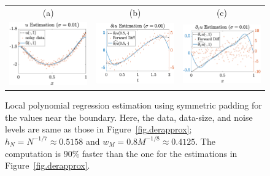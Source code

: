 \documentclass[a4paper,11pt]{article}
\begin{document}
\begin{figure}
\centering
\begin{tabular}{ccc}
(a)&(b)&(c)\\
\includegraphics[width=2in]{Figures/localpolyExp1.eps}&
\includegraphics[width=2in]{Figures/localpolyExp3.eps}&
\includegraphics[width=2in]{Figures/localpolyExp2.eps}
\end{tabular}
\caption{Local polynomial regression estimation using symmetric padding for the values near the boundary. Here, the data, data-size, and noise levels are same as those in Figure~\ref{fig.derapprox}; $h_N=N^{-1/7}\approx0.5158$ and $w_M=0.8M^{-1/8}\approx0.4125$. The computation is $90\%$ faster than the one for the estimations in Figure~\ref{fig.derapprox}.}\label{fig.derapprox1}	
\end{figure}
\end{document}
